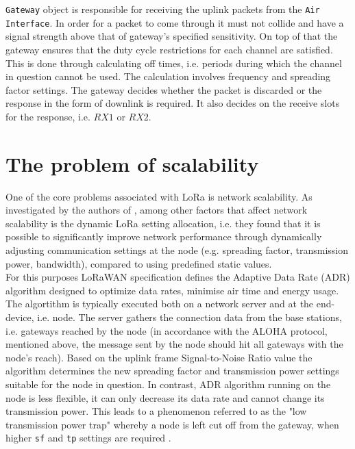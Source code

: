 \texttt{Gateway} object is responsible for receiving 
the uplink packets from the \texttt{Air Interface}. In order for a packet to come through it must not collide and have  a signal strength above that of gateway's specified sensitivity. On top of that the gateway ensures that the duty cycle restrictions for each channel are satisfied. This is done through
calculating off times, i.e. periods during which the 
channel in question cannot be used. The calculation
involves frequency and spreading factor settings. The gateway decides 
whether the packet is discarded or the response in 
the form of downlink is required. It also decides on the
receive slots for the response, i.e. $RX1$ or $RX2$.\\


\section{The problem of scalability}

One of the core problems associated with LoRa is network 
scalability. As investigated by the authors of
\cite{collision_conditions}, among other factors that
affect network scalability is the dynamic LoRa setting
allocation, i.e. they found that it is possible
to significantly improve network performance through
dynamically adjusting communication settings at the
node (e.g. spreading factor, transmission power, bandwidth), compared to using predefined static values.\\

For this purposes LoRaWAN specification 
\cite{lorawan_spec} defines the Adaptive Data Rate
(ADR) algorithm designed to optimize data rates, minimise air time and energy usage. The algortithm
is typically executed both on a network server and at the 
end-device, i.e. node. 
The server gathers the connection data from the base stations, i.e. gateways reached by the node (in accordance with the ALOHA protocol, mentioned above, the message 
sent by the node should hit all gateways
with the node's reach). Based on the uplink frame Signal-to-Noise Ratio value the algorithm determines the new
spreading factor and transmission power settings suitable
for the node in question. In contrast, ADR algorithm running on the node is less flexible, it can only decrease its
data rate and cannot change its transmission power.
This leads to a phenomenon referred to as the "low 
transmission power trap" \cite{low_power_trap} whereby a
node is left cut off from the gateway, when higher \texttt{sf} and \texttt{tp} settings are required .\\

